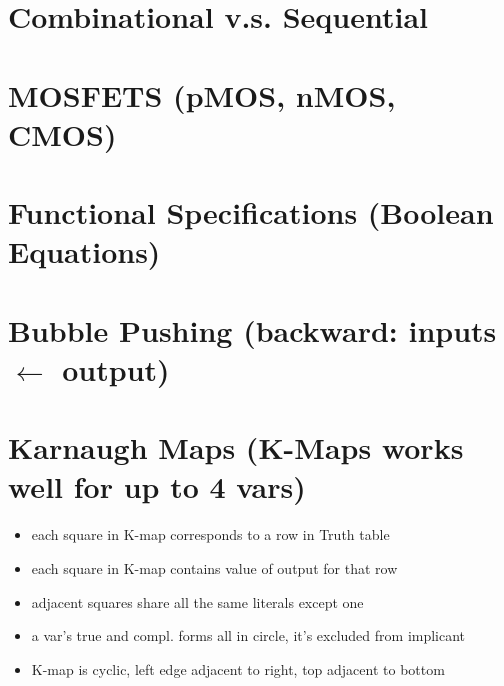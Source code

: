 \documentclass[8pt,a4paper,landscape]{extarticle}
\begin{document}
\pagestyle{empty}
\setlength{\abovedisplayskip}{1pt}
\setlength{\belowdisplayskip}{1pt}
\setlength{\abovedisplayshortskip}{0pt}
\setlength{\belowdisplayshortskip}{0pt}

\begin{multicols*}{3}

% 


\section*{Combinational v.s. Sequential}
% 

\section*{MOSFETS (pMOS, nMOS, CMOS)}
% 

\section*{Functional Specifications (Boolean Equations)}
% 

\section*{Bubble Pushing (backward: inputs $\leftarrow$ output)}
% 

\section*{Karnaugh Maps (K-Maps works well for up to 4 vars)}
\begin{itemize}
\item each square in K-map corresponds to a row in Truth table
\item each square in K-map contains value of output for that row
\item adjacent squares share all the same literals except one
\item a var's true and compl. forms all in circle, it's excluded from implicant
\item K-map is cyclic, left edge adjacent to right,  top adjacent to bottom
\end{itemize}


\end{multicols*}
\end{document}
